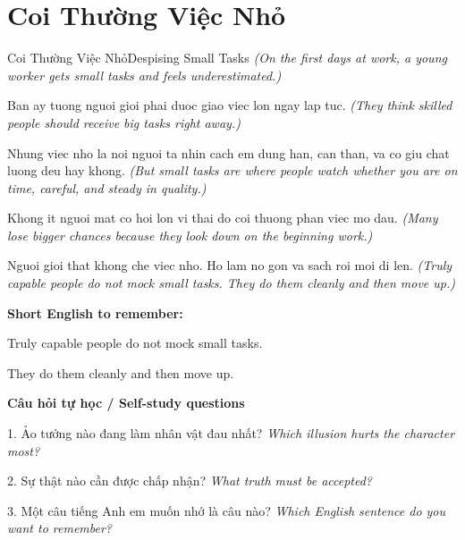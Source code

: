 \section{Coi Thường Việc Nhỏ}
\begin{truyen}{Coi Thường Việc Nhỏ}{Despising Small Tasks}
\textit{(On the first days at work, a young worker gets small tasks and feels underestimated.)}

Ban ay tuong nguoi gioi phai duoc giao viec lon ngay lap tuc.
\textit{(They think skilled people should receive big tasks right away.)}

Nhung viec nho la noi nguoi ta nhin cach em dung han, can than, va co giu chat luong deu hay khong.
\textit{(But small tasks are where people watch whether you are on time, careful, and steady in quality.)}

Khong it nguoi mat co hoi lon vi thai do coi thuong phan viec mo dau.
\textit{(Many lose bigger chances because they look down on the beginning work.)}

\end{truyen}

\begin{baihoc}
Nguoi gioi that khong che viec nho. Ho lam no gon va sach roi moi di len.
\textit{(Truly capable people do not mock small tasks. They do them cleanly and then move up.)}
\end{baihoc}

\begin{ghinhoanh}
\textbf{Short English to remember:}

Truly capable people do not mock small tasks.

They do them cleanly and then move up.

\end{ghinhoanh}

\begin{tuhocnhanh}
\textbf{Câu hỏi tự học / Self-study questions}

1. Ảo tưởng nào đang làm nhân vật đau nhất? \textit{Which illusion hurts the character most?}

2. Sự thật nào cần được chấp nhận? \textit{What truth must be accepted?}

3. Một câu tiếng Anh em muốn nhớ là câu nào? \textit{Which English sentence do you want to remember?}
\end{tuhocnhanh}
\ngancach

